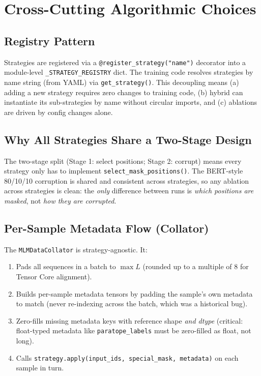 \documentclass[11pt]{article}
\begin{document}
\section{Cross-Cutting Algorithmic Choices}

\subsection{Registry Pattern}
Strategies are registered via a \texttt{@register\_strategy("name")}
decorator into a module-level \texttt{\_STRATEGY\_REGISTRY} dict. The
training code resolves strategies by name string (from YAML) via
\texttt{get\_strategy()}. This decoupling means (a) adding a new
strategy requires zero changes to training code, (b) hybrid can
instantiate its sub-strategies by name without circular imports, and
(c) ablations are driven by config changes alone.

\subsection{Why All Strategies Share a Two-Stage Design}
The two-stage split (Stage 1: select positions; Stage 2: corrupt)
means every strategy only has to implement
\texttt{select\_mask\_positions()}. The BERT-style 80/10/10 corruption
is shared and consistent across strategies, so any ablation across
strategies is clean: the \emph{only} difference between runs is
\emph{which positions are masked}, not \emph{how they are corrupted}.

\subsection{Per-Sample Metadata Flow (Collator)}
The \texttt{MLMDataCollator} is strategy-agnostic. It:
\begin{enumerate}
\item Pads all sequences in a batch to $\max L$ (rounded up to a
multiple of 8 for Tensor Core alignment).
\item Builds per-sample metadata tensors by padding the sample's own
metadata to match (never re-indexing across the batch, which was a
historical bug).
\item Zero-fills missing metadata keys with reference shape \emph{and
dtype} (critical: float-typed metadata like
\texttt{paratope\_labels} must be zero-filled as float, not long).
\item Calls \texttt{strategy.apply(input\_ids, special\_mask,
metadata)} on each sample in turn.
\end{enumerate}
\end{document}
